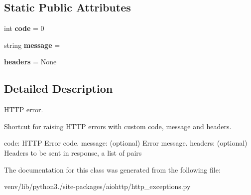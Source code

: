 \subsection*{Static Public Attributes}
\begin{DoxyCompactItemize}
\item 
\mbox{\label{classaiohttp_1_1http__exceptions_1_1_http_processing_error_a69ebbdf6b5c2081c537fd5472736009e}} 
int {\bfseries code} = 0
\item 
\mbox{\label{classaiohttp_1_1http__exceptions_1_1_http_processing_error_a3b79c9db8b3e78d58cf62d78d24e8eae}} 
string {\bfseries message} = \textquotesingle{}\textquotesingle{}
\item 
\mbox{\label{classaiohttp_1_1http__exceptions_1_1_http_processing_error_a576a10fb28e77ad936cc7f031a21947e}} 
{\bfseries headers} = None
\end{DoxyCompactItemize}


\subsection{Detailed Description}
\begin{DoxyVerb}HTTP error.

Shortcut for raising HTTP errors with custom code, message and headers.

code: HTTP Error code.
message: (optional) Error message.
headers: (optional) Headers to be sent in response, a list of pairs
\end{DoxyVerb}
 

The documentation for this class was generated from the following file\+:\begin{DoxyCompactItemize}
\item 
venv/lib/python3./site-\/packages/aiohttp/http\+\_\+exceptions.\+py\end{DoxyCompactItemize}
